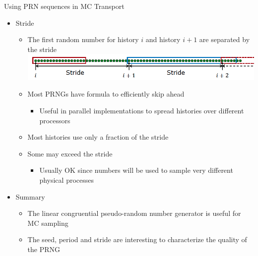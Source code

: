 \documentclass[xcolor=x11names,compress]{beamer}
\renewcommand{\(}{\begin{columns}}
\renewcommand{\)}{\end{columns}}
\newcommand{\<}[1]{\begin{column}{#1}}
\renewcommand{\>}{\end{column}}
\begin{document}
\begin{frame}{Using PRN sequences in MC Transport}
\begin{itemize}
\item Stride
\begin{itemize}
\item The first random number for history $i$ and history $i+1$ are separated by the stride
\includegraphics[scale=0.35]{rng3}
\item Most PRNGs have formula to efficiently skip ahead
\begin{itemize}
\item Useful in parallel implementations to spread histories over different processors
\end{itemize}
\item Most histories use only a fraction of the stride
\item Some may exceed the stride
\begin{itemize}
\item Usually OK since numbers will be used to sample very different physical processes
\end{itemize}
\end{itemize}  	
\item Summary
\begin{itemize}
\item The linear congruential pseudo-random number generator is useful for MC sampling
\item The seed, period and stride are interesting to characterize the quality of the PRNG
\end{itemize}
\end{itemize}  	
\end{frame}
\end{document}
